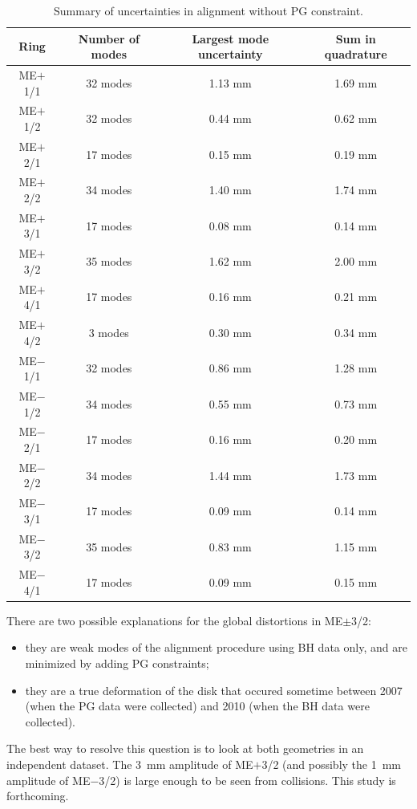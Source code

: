 \documentclass[12pt]{article}
\begin{document}
\begin{table}
\caption{Summary of uncertainties in alignment without PG constraint. \label{tab:uncertainties}}
\begin{center}
\begin{tabular}{c c c c}
Ring & Number of modes & Largest mode uncertainty & Sum in quadrature \\\hline
ME$+$1/1 & 32 modes & 1.13 mm & 1.69 mm \\
ME$+$1/2 & 32 modes & 0.44 mm & 0.62 mm \\
ME$+$2/1 & 17 modes & 0.15 mm & 0.19 mm \\
ME$+$2/2 & 34 modes & 1.40 mm & 1.74 mm \\
ME$+$3/1 & 17 modes & 0.08 mm & 0.14 mm \\
ME$+$3/2 & 35 modes & 1.62 mm & 2.00 mm \\
ME$+$4/1 & 17 modes & 0.16 mm & 0.21 mm \\
ME$+$4/2 & 3 modes  & 0.30 mm & 0.34 mm \\\hline
ME$-$1/1 & 32 modes & 0.86 mm & 1.28 mm \\
ME$-$1/2 & 34 modes & 0.55 mm & 0.73 mm \\
ME$-$2/1 & 17 modes & 0.16 mm & 0.20 mm \\
ME$-$2/2 & 34 modes & 1.44 mm & 1.73 mm \\
ME$-$3/1 & 17 modes & 0.09 mm & 0.14 mm \\
ME$-$3/2 & 35 modes & 0.83 mm & 1.15 mm \\
ME$-$4/1 & 17 modes & 0.09 mm & 0.15 mm
\end{tabular}
\end{center}
\end{table}


There are two possible explanations for the global distortions in
ME$\pm$3/2:
\begin{itemize}
\item they are weak modes of the alignment procedure using BH data
  only, and are minimized by adding PG constraints;
\item they are a true deformation of the disk that occured sometime
  between 2007 (when the PG data were collected) and 2010 (when the BH
  data were collected).
\end{itemize}
The best way to resolve this question is to look at both geometries in
an independent dataset.  The 3~mm amplitude of ME$+$3/2 (and possibly
the 1~mm amplitude of ME$-$3/2) is large enough to be seen from
collisions.  This study is forthcoming.
\end{document}
